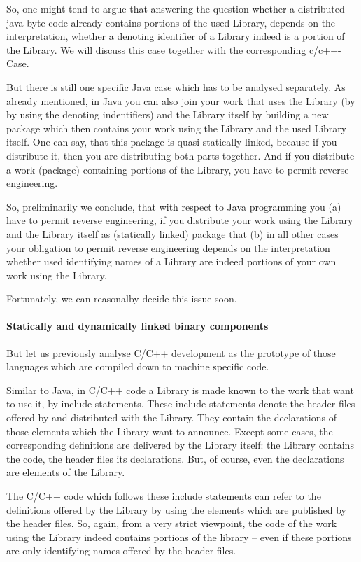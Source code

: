 So, one might tend to argue that answering the question whether a distributed
java byte code already contains portions of the used Library, depends on the
interpretation, whether a denoting identifier of a Library indeed is a portion
of the Library. We will discuss this case together with the corresponding
c/c++-Case. 

But there is still one specific Java case which has to be analysed separately.
As already mentioned, in Java you can also join your work that uses the Library
(by by using the denoting indentifiers) and the Library itself by building a new
package which then contains your work using the Library and the used Library
itself. One can say, that this package is quasi statically linked, because if
you distribute it, then you are distributing both parts together. And if you
distribute a work (package) containing portions of the Library, you have to
permit reverse engineering.

So, preliminarily we conclude, that with respect to Java programming you (a)
have to permit reverse engineering, if you distribute your work using the
Library and the Library itself as (statically linked) package that (b) in all
other cases your obligation to permit reverse engineering depends on the
interpretation whether used identifying names of a Library are indeed portions
of your own work using the Library.

Fortunately, we can reasonalby decide this issue soon.

\paragraph{Statically and dynamically linked binary components}

But let us previously analyse C/C++ development as the prototype of those
languages which are compiled down to machine specific code. 

Similar to Java, in C/C++ code a Library is made known to the work that want to
use it, by include statements. These include statements denote the header files
offered by and distributed with the Library. They contain the declarations of
those elements which the Library want to announce. Except some cases, the
corresponding definitions are delivered by the Library itself: the Library
contains the code, the header files its declarations. But, of course, even the 
declarations are elements of the Library. 

The C/C++ code which follows these include statements can refer to the
definitions offered by the Library by using the elements which are published by
the header files. So, again, from a very strict viewpoint, the code of the work
using the Library indeed contains portions of the library -- even if these
portions are only identifying names offered by the header files.


